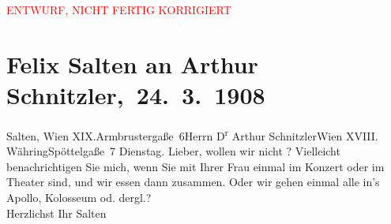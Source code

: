 
\begin{center}
            \textcolor{red}{ENTWURF, NICHT FERTIG KORRIGIERT}
                      \end{center}
            
         
         \renewcommand{\erwaehntePersonen}{Personen: Olga Schnitzler}
         \renewcommand{\erwaehnteOrte}{Orte: Apollo-Theater, Armbrustergasse, Colosseum, Edmund-Weiß-Gasse 7, I., Innere Stadt, Ronacher, Wien, XIX., Döbling, XVIII., Währing}
         \renewcommand{\erwaehnteWerke}{}
               \section[ Felix Salten an Arthur Schnitzler, 24. 3. 1908]{ Felix Salten an Arthur Schnitzler, 24. 3. 1908}\nopagebreak{}\rehead{ }\begin{ledgroupsized}[t]{13cm}\normalsize\beginnumbering \toendnotes[C]{\smallbreak\pagebreak[2]} 
\toendnotes[C]{\smallbreak}\pstart{}{\pb}Salten, Wien XIX.\pend{}\pstart{}Armbrustergaße 6\pend{}{\bigskip}\pstart{}Herrn D\textsuperscript{r} Arthur Schnitzler\pend{}\pstart{}Wien XVIII. Währing\pend{}\pstart{}Spöttelgaße 7\pend{}{\bigskip}\pstart
           \raggedleft{}{\pb}Dienstag.\pend
           \pstart{}Lieber,\pend\pstart
           wollen wir nicht \label{K_L03493-1v}\label{K_L03493-1h}? Vielleicht benachrichtigen Sie mich, wenn Sie mit Ihrer Frau einmal im Konzert oder im
               Theater sind, und wir essen dann zusammen. Oder wir gehen einmal alle in’s Apollo, Kolosseum od. dergl.? {\\}Herzlichst\pend
           \pstart Ihr \spacefill\mbox{Salten}\pend{}
         
         \endnumbering{}\end{ledgroupsized}  \newcommand{\dateiname}{L03493}\newcommand{\titel}{Felix Salten an Arthur Schnitzler, 24. 3. 1908}\newcommand{\editorInnen}{Martin Anton Müller und Laura Untner}
      